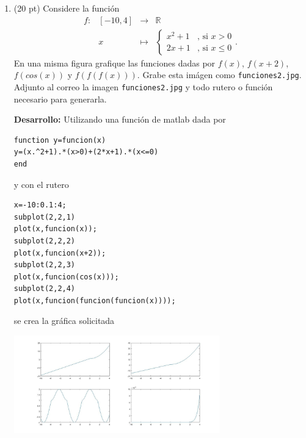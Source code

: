 \documentclass[11pt]{article}
\begin{document}
\begin{enumerate}
\begin{enumerate}
\begin{minipage}{0.8\textwidth}
\begin{lstlisting}
  clear all;
[L,U,P]=lu(mimatriz(10));
y=(P*L)\[1:10]';
x=U\y
\end{lstlisting}
\end{minipage}
\hfill \fbox{5pt}

\item De donde se observa que el comando \texttt{lu()} de Matlab si utiliz\'o pivoteo parcial, puesto $P$ es una permutaci\'on de la identidad. \hfill \fbox{5pt}

\item Se puede demostrar o calcular con el comando \texttt{norm()} y su valor es $145$. \hfill \fbox{5pt}
\end{enumerate}

\item (20 pt) Considere la funci\'on
$$
\begin{array}{crcl}
f:	&[-10,4] & \longrightarrow 	& \mathbb{R} \\
	& x		& \longmapsto		& \begin{cases}
    								x^2+1   & \text{, si } x>0 \\
                                    2x+1	& \text{, si } x\leq 0
    								\end{cases}.
\end{array}
$$
En una misma figura grafique las funciones dadas por $f(x)$, $f(x+2)$, $f(cos(x))$ y $f(f(f(x)))$. Grabe esta im\'agen como \texttt{funciones2.jpg}. Adjunto al correo la imagen \texttt{funciones2.jpg} y todo rutero o funci\'on necesario para generarla.

 \textbf{Desarrollo:} Utilizando una funci\'on de matlab dada por
\begin{lstlisting}
function y=funcion(x)
y=(x.^2+1).*(x>0)+(2*x+1).*(x<=0)
end
\end{lstlisting}
y con el rutero

\begin{minipage}{0.8\textwidth}
\begin{lstlisting}
x=-10:0.1:4;
subplot(2,2,1)
plot(x,funcion(x));
subplot(2,2,2)
plot(x,funcion(x+2));
subplot(2,2,3)
plot(x,funcion(cos(x)));
subplot(2,2,4)
plot(x,funcion(funcion(funcion(x))));
\end{lstlisting}
\end{minipage}
 \fbox{10pt}
 
se crea la gr\'afica solicitada
\begin{center}
\includegraphics[width=0.7\textwidth]{funciones.jpg} 
\fbox{10 pt}
\end{center}

\end{enumerate}
\end{document}

